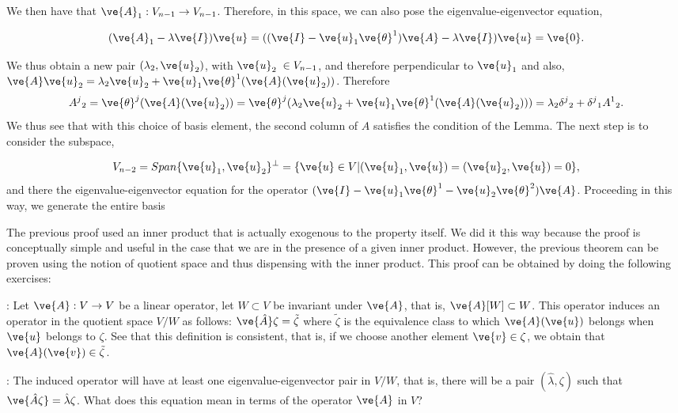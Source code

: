 We then have that $\ve{A}_1 : V_{n-1} \to V_{n-1}$. Therefore, in this space, we can also pose the eigenvalue-eigenvector equation, 

\begin{equation}
(\ve{A}_1 - \lambda \ve{I})\ve{u} = ((\ve{I} - \ve{u}_1 \ve{\theta}^1)\ve{A} - \lambda \ve{I})\ve{u} = \ve{0}.
\end{equation}
%

We thus obtain a new pair $(\lambda_2,\ve{u}_2)$, with $\ve{u}_2 \;\in V_{n-1}$, and therefore perpendicular
to $\ve{u}_1$ and also,
$\ve{A} \ve{u}_2 = \lambda_2 \ve{u}_2 + \ve{u}_1 \ve{\theta}^1(\ve{A}(\ve{u}_2))$.
Therefore 
\[
A^j{}_2 = \ve{\theta}^j(\ve{A}(\ve{u}_2))
         = \ve{\theta}^j(\lambda_2 \ve{u}_2 + \ve{u}_1 \ve{\theta}^1(\ve{A}(\ve{u}_2)))
         = \lambda_2 \delta^j{}_2 + \delta^j{}_1 A^1{}_2.
\]
%
We thus see that with this choice of basis element, the second column of $A$ satisfies the condition of the Lemma.
The next step is to consider the subspace,

\[
V_{n-2} = Span\{\ve{u}_1, \ve{u}_2\}^{\perp}
        = \{\ve{u} \in V | (\ve{u}_1,\ve{u}) = (\ve{u}_2,\ve{u}) = 0 \},
\]
%
and there the eigenvalue-eigenvector equation for the operator
$(\ve{I} - \ve{u}_1 \ve{\theta}^1 - \ve{u}_2 \ve{\theta}^2)\ve{A}$.
Proceeding in this way, we generate the entire basis\epru
\espa

The previous proof used an inner product that is actually exogenous to the property itself.
We did it this way because the proof is conceptually simple and useful in the case that we are in the presence of a given inner product.
However, the previous theorem can be proven using the notion of quotient space and thus dispensing with the inner product. 
This proof can be obtained by doing the following exercises:

\ejer: Let $\ve{A}: V \to V$ be a linear operator, let $W\subset V$ be invariant under $\ve{A}$, that is, $\ve{A}[W]\subset W$.
This operator induces an operator in the quotient space $V/W$ as follows: 
$\ve{\hat{A}}\zeta = \tilde{\zeta}$ where $\tilde{\zeta}$ is the equivalence class to which $\ve{A}(\ve{u})$ belongs when $\ve{u}$ belongs to $\zeta$. See that this definition is consistent, that is, if we choose another element $\ve{v} \in \zeta$, we obtain that $\ve{A}(\ve{v}) \in \tilde{\zeta}$.

\ejer: The induced operator will have at least one eigenvalue-eigenvector pair in $V/W$, that is, there will be a pair
$(\hat{\lambda}, \zeta)$ such that $\ve{\hat{A}\zeta} = \hat{\lambda}\zeta$. What does this equation mean in terms of the operator $\ve{A}$ in $V$?

